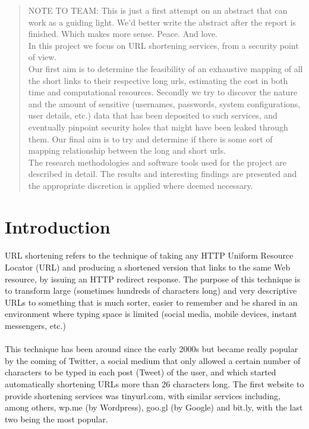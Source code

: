 \documentclass[12pt]{article}
\begin{document}
\begin{abstract}
\noindent
NOTE TO TEAM: This is just a first attempt on an abstract that can work as a guiding light. We'd better write the abstract after the report is finished. Which makes more sense. Peace. And love. \\[0.5cm]
In this project we focus on URL shortening services, from a security point of view.\\ Our first aim is to determine the feasibility of an exhaustive mapping of all the short links to their respective long urls, estimating the cost in both time and computational resources. Secondly we try to discover the nature and the amount of sensitive (usernames, passwords, system configurations, user details, etc.) data that has been deposited to such services, and eventually pinpoint security holes that might have been leaked through them. Our final aim is to try and determine if there is some sort of mapping relationship between the long and short urls. \\
The research methodologies and software tools used for the project are described in detail. The results and interesting findings are presented and the appropriate discretion is applied where deemed necessary. 


\end{abstract}
\newpage

%
\section{Introduction}
%
\paragraph{}
URL shortening refers to the technique of taking any HTTP Uniform Resource Locator (URL) and producing a shortened version that links to the same Web resource, by issuing an HTTP redirect response. The purpose of this technique is to transform large (sometimes hundreds of characters long) and very descriptive URLs to something that is much sorter, easier to remember and be shared in an environment where typing space is limited (social media, mobile devices, instant messengers, etc.)
\paragraph{}
This technique has been around since the early 2000s but became really popular by the coming of Twitter, a social medium that only allowed a certain number of characters to be typed in each post (Tweet) of the user, and which started automatically shortening URLs more than 26 characters long. The first website to provide shortening services was tinyurl.com, with similar services including, among others, wp.me (by Wordpress), goo.gl (by Google) and bit.ly, with the last two being the most popular. 
\end{document}
